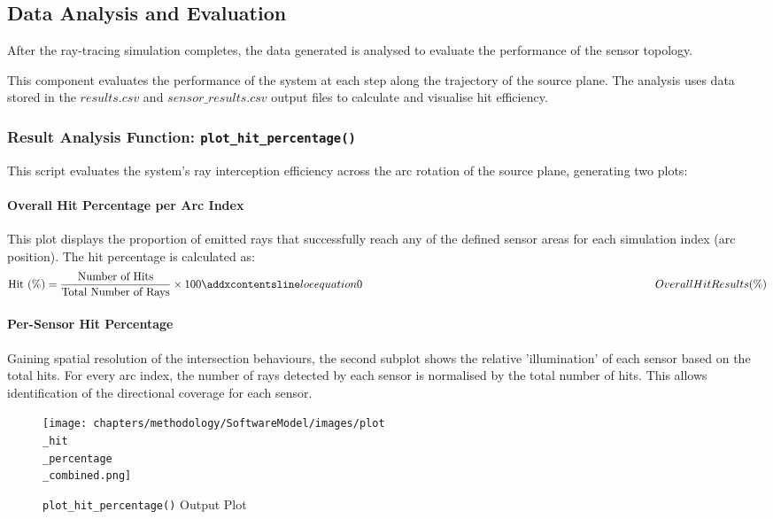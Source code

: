 \subsection{Data Analysis and Evaluation}
After the ray-tracing simulation completes, the data generated is analysed to evaluate the performance of the sensor topology. 

This component evaluates the performance of the system at each step along the trajectory of the source plane. The analysis uses data stored in the $results.csv$ and $sensor\_results.csv$ output files to calculate and visualise hit efficiency. 

\subsubsection{Result Analysis Function: \texttt{plot\_hit\_percentage()}}

This script evaluates the system’s ray interception efficiency across the arc rotation of the source plane, generating two plots:

\paragraph{\textbf{Overall Hit Percentage per Arc Index}}

This plot displays the proportion of emitted rays that successfully reach any of the defined sensor areas for each simulation index (arc position). The hit percentage is calculated as:
\begin{equation}
    \text{Hit (\%)} = \frac{\text{Number of Hits}}{\text{Total Number of Rays}} \times 100
    \label{eq:Overall_Hit_Percentage}
    \addequation{Overall Hit Results (\%)}
    \end{equation}

\paragraph{\textbf{Per-Sensor Hit Percentage}}
Gaining spatial resolution of the intersection behaviours, the second subplot shows the relative 'illumination' of each sensor based on the total hits. For every arc index, the number of rays detected by each sensor is normalised by the total number of hits. This allows identification of the directional coverage for each sensor. 

\begin{figure}[htbp] %
    \centering
    \texttt{[image: chapters/methodology/SoftwareModel/images/plot\\\_hit\\\_percentage\\\_combined.png]} %
    \caption{\texttt{plot\_hit\_percentage()} Output Plot}       %
    \label{fig:Hit Percentage Output Plot}            %
\end{figure}                             %

